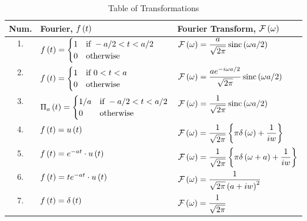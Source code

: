 \begin{table}[h]
    \centering
    \renewcommand{\arraystretch}{2.6}
    \caption{Table of Transformations}
    \label{table:1.1}
    \begin{tabular}{|c|m{7cm}|m{7cm}|}\hline
       Num.& \centering Fourier, $f\left(t\right)$ & \centering Fourier Transform, $\mathcal{F}\left(\omega\right)$ \arraybackslash \\ \hline\hline
       1.&$f\left(t\right)=\begin{cases}
           1 & \text{if }-a/2<t<a/2\\
           0 & \text{otherwise}
       \end{cases}$ & $\mathcal{F}\left(\omega\right)=\displaystyle\frac{a}{\sqrt{2\pi}}\operatorname{sinc}\left(\omega a/2\right)$\\ \hline
       2.&$f\left(t\right)=\begin{cases}
           1 & \text{if }0<t<a\\
           0 & \text{otherwise}
       \end{cases}$ & $\mathcal{F}\left(\omega\right)=\displaystyle\frac{ae^{-i\omega a/2}}{\sqrt{2\pi}}\operatorname{sinc}\left(\omega a/2\right)$\\ \hline
       3.&$\Pi_a\left(t\right)=\begin{cases}
           1/a & \text{if }-a/2<t<a/2\\
           0 & \text{otherwise}
       \end{cases}$  & $\mathcal{F}\left(\omega\right)=\displaystyle\frac{1}{\sqrt{2\pi}}\operatorname{sinc}\left(\omega a/2\right)$\\\hline
       4.&$f\left(t\right)=u\left(t\right)$ & $\mathcal{F}\left(\omega\right)=\displaystyle\frac{1}{\sqrt{2\pi}}\left\{\pi\delta\left(\omega\right)+\frac{1}{iw}\right\}$\\\hline
       5.&$f\left(t\right)=e^{-at}\cdot u\left(t\right)$ & $\mathcal{F}\left(\omega\right)=\displaystyle\frac{1}{\sqrt{2\pi}}\left\{\pi\delta\left(\omega+a\right)+\frac{1}{iw}\right\}$\\\hline
       6.&$f\left(t\right)=te^{-at}\cdot u\left(t\right)$ & $\mathcal{F}\left(\omega\right)=\displaystyle\frac{1}{\sqrt{2\pi}\left(a+iw\right)^2}$\\\hline
       7.&$f\left(t\right)=\delta\left(t\right)$ & $\mathcal{F}\left(\omega\right)=\displaystyle\frac{1}{\sqrt{2\pi}}$\\ \hline
    \end{tabular}
\end{table}
\newpage
